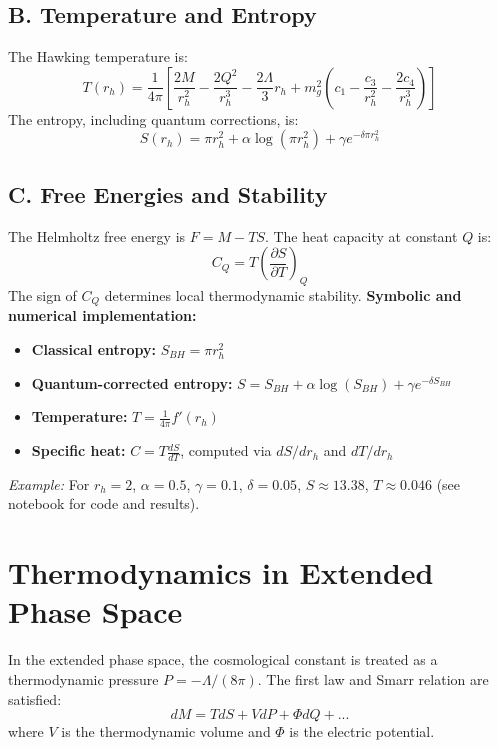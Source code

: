 \documentclass[12pt]{article}
\begin{document}
\subsection*{B. Temperature and Entropy}
The Hawking temperature is:
\begin{equation}
T(r_h) = \frac{1}{4\pi} \left[ \frac{2M}{r_h^2} - \frac{2Q^2}{r_h^3} - \frac{2\Lambda}{3} r_h + m_g^2 \left(c_1 - \frac{c_3}{r_h^2} - \frac{2c_4}{r_h^3}\right) \right]
\end{equation}
The entropy, including quantum corrections, is:
\begin{equation}
S(r_h) = \pi r_h^2 + \alpha \log(\pi r_h^2) + \gamma e^{-\delta \pi r_h^2}
\end{equation}

\subsection*{C. Free Energies and Stability}
The Helmholtz free energy is $F = M - T S$. The heat capacity at constant $Q$ is:
\begin{equation}
C_Q = T \left( \frac{\partial S}{\partial T} \right)_Q
\end{equation}
The sign of $C_Q$ determines local thermodynamic stability.
\textbf{Symbolic and numerical implementation:}
\begin{itemize}
    \item \textbf{Classical entropy:} $S_{BH} = \pi r_h^2$
    \item \textbf{Quantum-corrected entropy:} $S = S_{BH} + \alpha \log(S_{BH}) + \gamma e^{-\delta S_{BH}}$
    \item \textbf{Temperature:} $T = \frac{1}{4\pi} f'(r_h)$
    \item \textbf{Specific heat:} $C = T \frac{dS}{dT}$, computed via $dS/dr_h$ and $dT/dr_h$
\end{itemize}
\textit{Example:} For $r_h = 2$, $\alpha = 0.5$, $\gamma = 0.1$, $\delta = 0.05$, $S \approx 13.38$, $T \approx 0.046$ (see notebook for code and results).

\section{Thermodynamics in Extended Phase Space}
In the extended phase space, the cosmological constant is treated as a thermodynamic pressure $P = -\Lambda/(8\pi)$. The first law and Smarr relation are satisfied:
\begin{equation}
dM = T dS + V dP + \Phi dQ + ...
\end{equation}
where $V$ is the thermodynamic volume and $\Phi$ is the electric potential.
\end{document}
